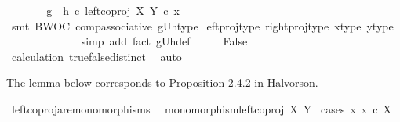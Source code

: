 \begin{isabellebody}
\ \ \isamarkupfalse%
\ \isamarkupfalse%
\ {\isachardoublequoteopen}{\isachardot}{\kern0pt}{\isachardot}{\kern0pt}{\isachardot}{\kern0pt}\ {\isacharequal}{\kern0pt}\ {\isacharparenleft}{\kern0pt}{\isacharparenleft}{\kern0pt}g\ {\isasymamalg}\ h{\isacharparenright}{\kern0pt}\ {\isasymcirc}\isactrlsub c\ {\isacharparenleft}{\kern0pt}left{\isacharunderscore}{\kern0pt}coproj\ X\ Y{\isacharparenright}{\kern0pt}{\isacharparenright}{\kern0pt}\ {\isasymcirc}\isactrlsub c\ x{\isachardoublequoteclose}\isanewline
\ \ \ \ \isamarkupfalse%
\ {\isacharparenleft}{\kern0pt}smt\ BWOC\ comp{\isacharunderscore}{\kern0pt}associative{}\ gUh{\isacharunderscore}{\kern0pt}type\ left{\isacharunderscore}{\kern0pt}proj{\isacharunderscore}{\kern0pt}type\ right{\isacharunderscore}{\kern0pt}proj{\isacharunderscore}{\kern0pt}type\ x{\isacharunderscore}{\kern0pt}type\ y{\isacharunderscore}{\kern0pt}type{\isacharparenright}{\kern0pt}\ \isanewline
\ \ \isamarkupfalse%
\ \isamarkupfalse%
\ {\isachardoublequoteopen}{\isachardot}{\kern0pt}{\isachardot}{\kern0pt}{\isachardot}{\kern0pt}\ {\isacharequal}{\kern0pt}\ {\isasymt}{\isachardoublequoteclose}\isanewline
\ \ \ \ \isamarkupfalse%
\ {\isacharparenleft}{\kern0pt}simp\ add{\isacharcolon}{\kern0pt}\ fact{}\ gUh{\isacharunderscore}{\kern0pt}def{\isacharparenright}{\kern0pt}\isanewline
\ \ \isamarkupfalse%
\ \isamarkupfalse%
\ False\isanewline
\ \ \ \ \isamarkupfalse%
\ calculation\ true{\isacharunderscore}{\kern0pt}false{\isacharunderscore}{\kern0pt}distinct\ \isamarkupfalse%
\ auto\isanewline
{}\isamarkupfalse%
%
\endisatagproof
{\isafoldproof}%
%
\isadelimproof
%
\endisadelimproof
%
\begin{isamarkuptext}%
The lemma below corresponds to Proposition 2.4.2 in Halvorson.%
\end{isamarkuptext}\isamarkuptrue%
\isamarkupfalse%
\ left{\isacharunderscore}{\kern0pt}coproj{\isacharunderscore}{\kern0pt}are{\isacharunderscore}{\kern0pt}monomorphisms{\isacharcolon}{\kern0pt}\isanewline
\ \ {\isachardoublequoteopen}monomorphism{\isacharparenleft}{\kern0pt}left{\isacharunderscore}{\kern0pt}coproj\ X\ Y{\isacharparenright}{\kern0pt}{\isachardoublequoteclose}\isanewline
%
\isadelimproof
%
\endisadelimproof
%
\isatagproof
{}\isamarkupfalse%
\ {\isacharparenleft}{\kern0pt}cases\ {\isachardoublequoteopen}{\isasymexists}x{\isachardot}{\kern0pt}\ x\ {\isasymin}\isactrlsub c\ X{\isachardoublequoteclose}{\isacharparenright}{\kern0pt}\isanewline

\end{isabellebody}
